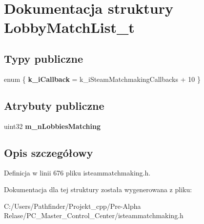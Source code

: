\hypertarget{struct_lobby_match_list__t}{}\section{Dokumentacja struktury Lobby\+Match\+List\+\_\+t}
\label{struct_lobby_match_list__t}
\subsection*{Typy publiczne}
\begin{DoxyCompactItemize}
\item 
\mbox{\label{struct_lobby_match_list__t_a4ff44c305742c2c357b68609ed5cdf3e}} 
enum \{ {\bfseries k\+\_\+i\+Callback} = k\+\_\+i\+Steam\+Matchmaking\+Callbacks + 10
 \}
\end{DoxyCompactItemize}
\subsection*{Atrybuty publiczne}
\begin{DoxyCompactItemize}
\item 
\mbox{\label{struct_lobby_match_list__t_ae042332e8d7decff351ee3b4817762ca}} 
uint32 {\bfseries m\+\_\+n\+Lobbies\+Matching}
\end{DoxyCompactItemize}


\subsection{Opis szczegółowy}


Definicja w linii 676 pliku isteammatchmaking.\+h.



Dokumentacja dla tej struktury została wygenerowana z pliku\+:\begin{DoxyCompactItemize}
\item 
C\+:/\+Users/\+Pathfinder/\+Projekt\+\_\+cpp/\+Pre-\/\+Alpha Relase/\+P\+C\+\_\+\+Master\+\_\+\+Control\+\_\+\+Center/isteammatchmaking.\+h\end{DoxyCompactItemize}
